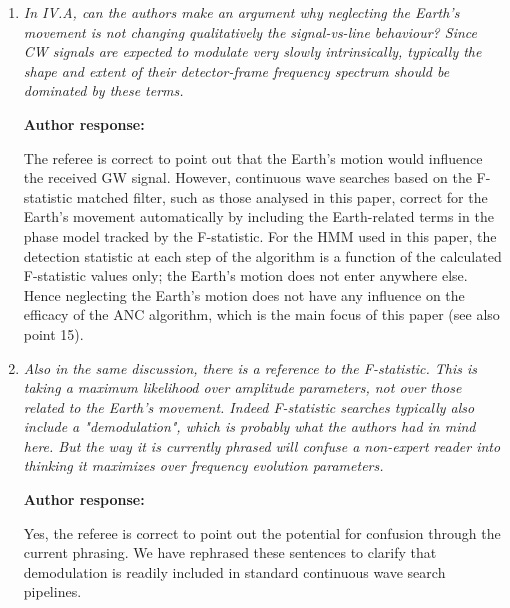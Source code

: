 \documentclass[10pt]{article}
\begin{document}
\begin{enumerate}
					\textbf{Author response:}  \newline 
					Yes, we agree with the referee's suggestion. We have updated Equation (12) to specify explicitly that the argmin is taken over the argument $\boldsymbol{w}$ (i.e. the tap weights), which influence the residual $e_k(\boldsymbol{w})$.
					
					
					
	\item \textit{In IV.A, can the authors make an argument why neglecting the Earth's  
		movement is not changing qualitatively the signal-vs-line behaviour? Since CW  
		signals are expected to modulate very slowly intrinsically, typically the shape  
		and extent of their detector-frame frequency spectrum should be dominated by  
		these terms.  }
	
			\textbf{Author response:} 
			
The referee is correct to point out that the Earth's motion would influence the received GW signal. However, continuous wave searches based on the F-statistic matched filter, such as those analysed in this paper, correct for the Earth's movement automatically by including the Earth-related terms in the phase model tracked by the F-statistic. For the HMM used in this paper, the detection statistic at each step of the algorithm is a function of the calculated F-statistic values only; the Earth's motion does not enter anywhere else. Hence neglecting the Earth's motion does not have any influence on the  efficacy of the ANC algorithm, which is the main focus of this paper (see also point 15). 



	\item \textit{Also in the same discussion, there is a reference to the F-statistic. This  
		is taking a maximum likelihood over amplitude parameters, not over those related  
		to the Earth's movement. Indeed F-statistic searches typically also include a  
		"demodulation", which is probably what the authors had in mind here. But the way  
		it is currently phrased will confuse a non-expert reader into thinking it  
		maximizes over frequency evolution parameters.  }
	
			\textbf{Author response:} 
			
	Yes, the referee is correct to point out the potential for confusion through the current phrasing. We have rephrased these sentences to clarify that demodulation is readily included in standard continuous wave search pipelines. 
	

\end{enumerate}
\end{document}
